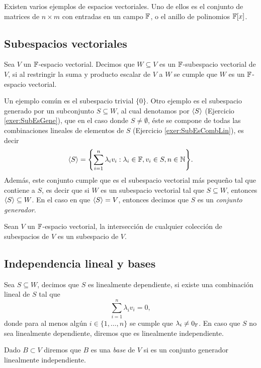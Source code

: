 Existen varios ejemplos de espacios vectoriales. Uno de ellos es el conjunto de matrices de $n \times m $ con entradas en un campo $\mathbb{F}$, o el anillo de polinomios $\mathbb{F}[x]$.

\subsection{Subespacios vectoriales}

\begin{defi}
  Sea $V$ un $\mathbb{F}$-espacio vectorial. Decimos que $W \subseteq V$ es un $\mathbb{F}$-subespacio vectorial de $V$, si al restringir la suma y producto escalar de $V$ a $W$ se cumple que $W$ es un $\mathbb{F}$-espacio vectorial.
\end{defi}

Un ejemplo común es el subespacio trivial $\{0\}$. Otro ejemplo es el subespacio generado por un subconjunto $S \subseteq W$, al cual denotamos por $\langle S\rangle$ (Ejercicio \ref{exer:SubEsGene}), que en el caso donde $S\neq \emptyset$, éste se compone de todas las combinaciones lineales de elementos de $S$ (Ejercicio \ref{exer:SubEsCombLin}), es decir
\[ \inner{S} = \set{ \sum_{i=1}^n \lambda_i v_i : \lambda_i \in \F, v_i \in S, n \in \N }. \]
Además, este conjunto cumple que es el subespacio vectorial más pequeño tal que contiene a $S$, es decir que si $W$ es un subespacio vectorial tal que $S \subseteq W$, entonces $\langle S\rangle \subseteq W$. En el caso en que $\langle S\rangle = V$, entonces decimos que $S$ es un \emph{conjunto generador}.

\begin{teor}
  Sean $V$ un $\mathbb{F}$-espacio vectorial, la intersección de cualquier colección de subespacios de $V$ es un subespacio de $V$.
\end{teor}

\subsection{Independencia lineal y bases}

\begin{defi}
  Sea $S \subseteq W$, decimos que $S$ es linealmente dependiente, si existe una combinación lineal de $S$ tal que
  \[ \sum_{i=1}^n \lambda_i v_i = 0, \]
  donde para al menos algún $i \in \{1,\ldots,n\}$ se cumple que $\lambda_i \neq 0_{\mathbb{F}}$. En caso que $S$ no sea linealmente dependiente, diremos que es linealmente independiente.

  Dado $B \subset V$ diremos que $B$ es una \emph{base} de $V$ si es un conjunto generador linealmente independiente.
\end{defi}

